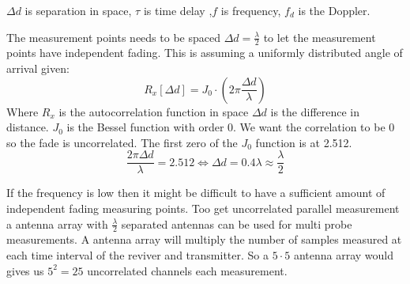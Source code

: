 $\Delta d$ is separation in space, $\tau$ is time delay ,$f$ is frequency, $f_d$ is the Doppler.


The measurement points needs to be spaced $\Delta d = \frac{\lambda}{2}$ to let the measurement points have independent fading. This is assuming a uniformly distributed angle of arrival given:
\begin{equation}
R_x[\Delta d] = J_0\cdot(2\pi \frac{\Delta d}{\lambda})
\end{equation}
Where $R_x$ is the autocorrelation function in space $\Delta d$ is the difference in distance. $J_0$ is the Bessel function with order 0.
We want the correlation to be 0 so the fade is uncorrelated. The first zero of the $J_0$ function is at 2.512.
\begin{equation}
\frac{2\pi \Delta d}{\lambda} = 2.512 \Leftrightarrow \Delta d = 0.4 \lambda \approx \frac{\lambda}{2}
\end{equation}

If the frequency is low then it might be difficult to have a sufficient amount of independent fading measuring points. \citep[p.11]{UWMeasurement} Too get uncorrelated  parallel measurement a antenna array with $\frac{\lambda}{2}$ separated antennas can be used for multi probe measurements. A antenna array will multiply the number of samples measured at each time interval of the reviver and transmitter. So a $5\cdot 5$ antenna array would gives us $5^2 = 25$ uncorrelated channels each measurement.




